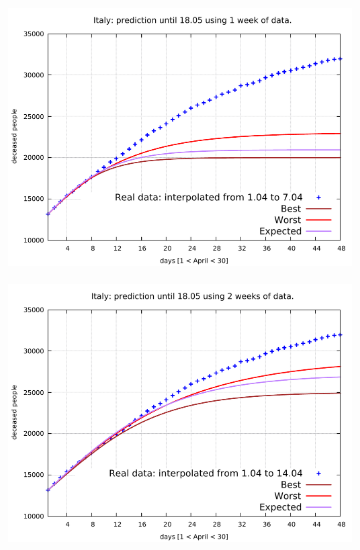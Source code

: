 \documentclass[8pt]{article}
\begin{document}
\begin{figure}[h!]
  \centering
  \begin{subfigure}[b]{0.45\linewidth}
  \includegraphics[width=\linewidth]{../simulations_v1/it/1-7/1-7.pdf}
  \end{subfigure}
  \begin{subfigure}[b]{0.45\linewidth}
    \includegraphics[width=\linewidth]{../simulations_v1/it/1-14/1-14.pdf}
  \end{subfigure}
  \begin{subfigure}[b]{0.45\linewidth}

\end{subfigure}
\end{figure}
\end{document}
